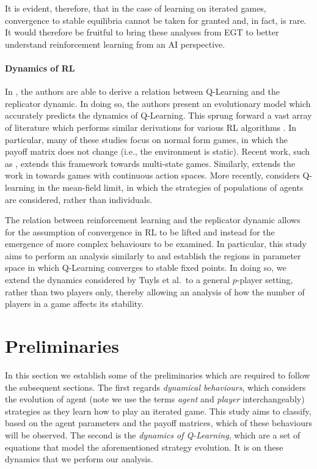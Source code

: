 \documentclass[sigconf,anonymous]{aamas}
\begin{document}
It is evident, therefore, that in the case of learning on iterated
games, convergence to stable equilibria cannot be taken for granted
and, in fact, is rare. It would therefore be fruitful to bring these
analyses from EGT to better understand reinforcement learning from an
AI perspective.

\paragraph{Dynamics of RL}
In \cite{Tuyls2006AnGames}, the authors are able to derive a relation
between Q-Learning
and the replicator
dynamic. In doing so, the authors present an evolutionary model which
accurately predicts the dynamics of Q-Learning. This sprung forward a
vast array of literature which performs similar derivations for various
RL algorithms \cite{Bloembergen2015}.
In particular,
many of these studies focus on normal form games, in which the payoff
matrix does not change (i.e., the environment is static). Recent work,
such as \cite{Hennes2008}, extends this framework towards multi-state
games.
Similarly, \cite{Galstyan2013} extends the work in
\cite{Tuyls2006AnGames} towards games with continuous action
spaces. More recently, \cite{Hu2019} considers Q-learning in the
mean-field limit, in which the strategies of populations of agents are
considered, rather than individuals.

The relation between reinforcement learning and the replicator dynamic
allows for the assumption of convergence in RL to be lifted and
instead for the emergence of more complex behaviours to be
examined. In particular, this study aims to perform an analysis
similarly to \cite{Sanders2018} and establish the regions in parameter
space in which Q-Learning converges to stable fixed points.
In doing so, we extend the dynamics considered by Tuyls et al.~to
a general $p$-player setting, rather than two players only, thereby
allowing an analysis of how the number of players in a game affects
its stability.


\section{Preliminaries}

In this section we establish some of the preliminaries which
are required to follow the subsequent sections. The first regards
\textit{dynamical behaviours}, which considers the evolution of agent (note we use the terms \textit{agent} and \textit{player} interchangeably)
strategies as they learn how to play an iterated game. This study aims to
classify, based on the agent parameters and the payoff matrices, which
of these behaviours will be observed. The second is the \textit{dynamics
  of Q-Learning}, which are a set of equations that model the
aforementioned strategy evolution. It is on these dynamics that we
perform our analysis.
\end{document}
